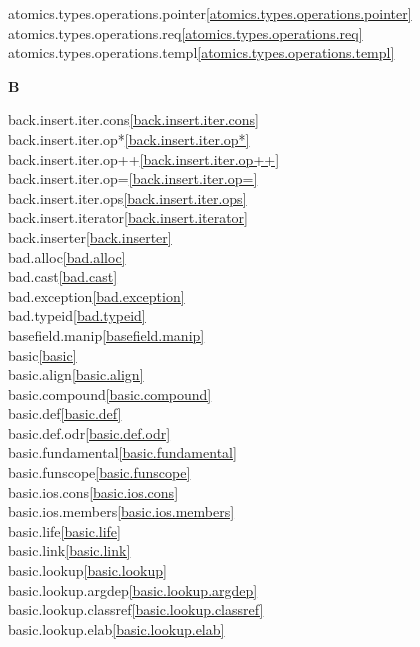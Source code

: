 \begin{multicols}{2}
atomics.types.operations.pointer\quad\ref{atomics.types.operations.pointer}\\
atomics.types.operations.req\quad\ref{atomics.types.operations.req}\\
atomics.types.operations.templ\quad\ref{atomics.types.operations.templ}\\
\par \textbf{B}\par
back.insert.iter.cons\quad\ref{back.insert.iter.cons}\\
back.insert.iter.op*\quad\ref{back.insert.iter.op*}\\
back.insert.iter.op++\quad\ref{back.insert.iter.op++}\\
back.insert.iter.op=\quad\ref{back.insert.iter.op=}\\
back.insert.iter.ops\quad\ref{back.insert.iter.ops}\\
back.insert.iterator\quad\ref{back.insert.iterator}\\
back.inserter\quad\ref{back.inserter}\\
bad.alloc\quad\ref{bad.alloc}\\
bad.cast\quad\ref{bad.cast}\\
bad.exception\quad\ref{bad.exception}\\
bad.typeid\quad\ref{bad.typeid}\\
basefield.manip\quad\ref{basefield.manip}\\
basic\quad\ref{basic}\\
basic.align\quad\ref{basic.align}\\
basic.compound\quad\ref{basic.compound}\\
basic.def\quad\ref{basic.def}\\
basic.def.odr\quad\ref{basic.def.odr}\\
basic.fundamental\quad\ref{basic.fundamental}\\
basic.funscope\quad\ref{basic.funscope}\\
basic.ios.cons\quad\ref{basic.ios.cons}\\
basic.ios.members\quad\ref{basic.ios.members}\\
basic.life\quad\ref{basic.life}\\
basic.link\quad\ref{basic.link}\\
basic.lookup\quad\ref{basic.lookup}\\
basic.lookup.argdep\quad\ref{basic.lookup.argdep}\\
basic.lookup.classref\quad\ref{basic.lookup.classref}\\
basic.lookup.elab\quad\ref{basic.lookup.elab}\\

\end{multicols}
